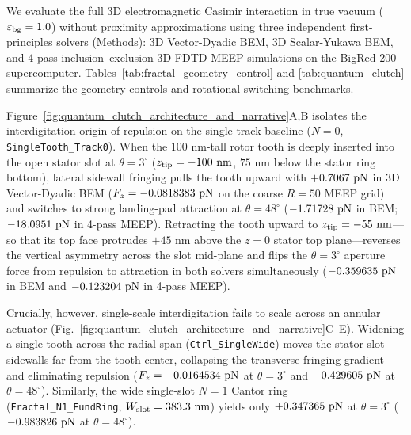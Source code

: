 \documentclass[11pt,letterpaper]{article}
\begin{document}
We evaluate the full 3D electromagnetic Casimir interaction in true vacuum ($\varepsilon_{\rm bg}=1.0$) without proximity approximations using three independent first-principles solvers (Methods): 3D Vector-Dyadic BEM, 3D Scalar-Yukawa BEM, and 4-pass inclusion--exclusion 3D FDTD MEEP simulations on the BigRed 200 supercomputer\cite{oskooi2010,rodriguez2011}. Tables~\ref{tab:fractal_geometry_control} and \ref{tab:quantum_clutch} summarize the geometry controls and rotational switching benchmarks.

Figure~\ref{fig:quantum_clutch_architecture_and_narrative}A,B isolates the interdigitation origin of repulsion on the single-track baseline ($N=0$, \texttt{SingleTooth\_Track0}). When the $100\text{ nm}$-tall rotor tooth is deeply inserted into the open stator slot at $\theta=3^\circ$ ($z_{\rm tip} = -100\text{ nm}$, $75\text{ nm}$ below the stator ring bottom), lateral sidewall fringing pulls the tooth upward with $+0.7067{}\text{ pN}$ in 3D Vector-Dyadic BEM ($F_z = -0.0818383{}\text{ pN}$ on the coarse $R=50$ MEEP grid) and switches to strong landing-pad attraction at $\theta=48^\circ$ ($-1.71728{}\text{ pN}$ in BEM; $-18.0951{}\text{ pN}$ in 4-pass MEEP). Retracting the tooth upward to $z_{\rm tip} = -55\text{ nm}$---so that its top face protrudes $+45\text{ nm}$ above the $z=0$ stator top plane---reverses the vertical asymmetry across the slot mid-plane and flips the $\theta=3^\circ$ aperture force from repulsion to attraction in both solvers simultaneously ($-0.359635{}\text{ pN}$ in BEM and $-0.123204{}\text{ pN}$ in 4-pass MEEP).

Crucially, however, single-scale interdigitation fails to scale across an annular actuator (Fig.~\ref{fig:quantum_clutch_architecture_and_narrative}C--E). Widening a single tooth across the radial span (\texttt{Ctrl\_SingleWide}) moves the stator slot sidewalls far from the tooth center, collapsing the transverse fringing gradient and eliminating repulsion ($F_z = -0.0164534{}\text{ pN}$ at $\theta=3^\circ$ and $-0.429605{}\text{ pN}$ at $\theta=48^\circ$). Similarly, the wide single-slot $N=1$ Cantor ring (\texttt{Fractal\_N1\_FundRing}, $W_{\rm slot} = 383.3\text{ nm}$) yields only $+0.347365{}\text{ pN}$ at $\theta=3^\circ$ ($-0.983826{}\text{ pN}$ at $\theta=48^\circ$).
\end{document}
